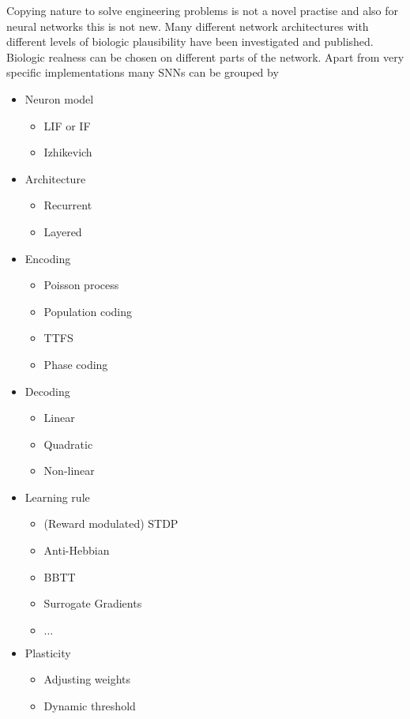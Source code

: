 Copying nature to solve engineering problems is not a novel practise and also for neural networks this is not new. Many different network architectures with different levels of biologic plausibility have been investigated and published. Biologic realness can be chosen on different parts of the network. Apart from very specific implementations many \acp{SNN} can be grouped by
\begin{itemize}
	\item Neuron model
	\begin{itemize}
		\item LIF or IF
		\item Izhikevich
	\end{itemize}
	\item Architecture
	\begin{itemize}
		\item Recurrent
		\item Layered
	\end{itemize}
	\item Encoding
	\begin{itemize}
		\item Poisson process
		\item Population coding
		\item TTFS
		\item Phase coding
	\end{itemize}
	\item Decoding
	\begin{itemize}
		\item Linear
		\item Quadratic
		\item Non-linear
	\end{itemize}
	\item Learning rule
	\begin{itemize}
		\item (Reward modulated) STDP
		\item Anti-Hebbian
		\item BBTT
		\item Surrogate Gradients
		\item $\dots$
	\end{itemize}
	\item Plasticity
	\begin{itemize}
		\item Adjusting weights
		\item Dynamic threshold
	\end{itemize}
\end{itemize}

